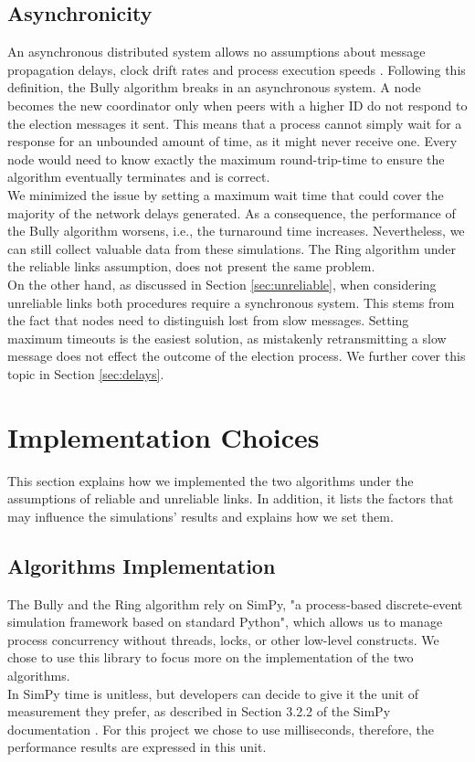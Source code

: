 \documentclass[10pt,journal,compsoc]{IEEEtran}
\begin{document}
\subsection{Asynchronicity}
\label{sec:asyn}
An asynchronous distributed system allows no assumptions about message
propagation delays, clock drift rates and process execution speeds
\cite{book:ds_c_and_d}. 
Following this definition, the Bully algorithm breaks in an asynchronous system.
A node becomes the new coordinator only when peers with a higher ID do not
respond to the election messages it sent. This means that a process cannot
simply wait for a response for an unbounded amount of time, as it might never
receive one. Every node would need to know exactly the maximum round-trip-time
to ensure the algorithm eventually terminates and is correct.
\\We minimized the issue by setting a maximum wait time that could cover the
majority of the network delays generated. As a consequence, the performance of
the Bully algorithm worsens, i.e., the turnaround time increases. Nevertheless,
we can still collect valuable data from these simulations.
The Ring algorithm under the reliable links assumption, does not present the
same problem.
\\On the other hand, as discussed in Section \ref{sec:unreliable}, when
considering unreliable links both procedures require a synchronous system. This
stems from the fact that nodes need to distinguish lost from slow messages.
Setting maximum timeouts is the easiest solution, as mistakenly retransmitting a
slow message does not effect the outcome of the election process. We further
cover this topic in Section \ref{sec:delays}.
\section{Implementation Choices}
\label{sec:implementation}
This section explains how we implemented the two algorithms under the
assumptions of reliable and unreliable links. In addition, it lists the factors
that may influence the simulations' results and explains how we set them.
\subsection{Algorithms Implementation}
\label{sec:implementation}
The Bully and the Ring algorithm rely on SimPy, "a process-based discrete-event
simulation framework based on standard Python"\cite{book:simpy}, which allows us
to manage process concurrency without threads, locks, or other low-level
constructs. We chose to use this library to focus more on the implementation of
the two algorithms.
\\In SimPy time is unitless, but developers can decide to give it the unit of
measurement they prefer, as described in Section 3.2.2 of the SimPy
documentation \cite{book:simpytime}. For this project we chose to use
milliseconds, therefore, the performance results are expressed in this unit.
\end{document}
